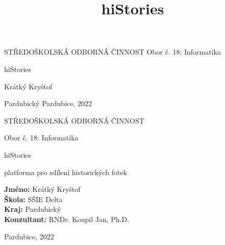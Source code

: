 \documentclass[12pt, a4paper,
 twoside,        %
 openright
]{report}
\title{hiStories} %
\author{\name} %
\date{\publicationYear} %
\newcommand\city{Pardubice}
\newcommand\district{Pardubický}
\newcommand\specialization{Obor č. 18: Informatika}
\newcommand\school{SŠIE Delta}
\newcommand\consultant{RNDr. Koupil Jan, Ph.D.}
\newcommand\name{Krátký Kryštof}
\newcommand\publicationYear{2022}
\begin{document}
\pagestyle{empty}

\begin{titlepage}
    \bfseries{ %
        \begin{center}
            \LARGE{STŘEDOŠKOLSKÁ ODBORNÁ ČINNOST} 
            \vspace{14pt}
            \large{\specialization} 

            \vspace{0.4 \textheight}

            \LARGE{ %
                hiStories
            }%

            \vspace{0.4\textheight}
        \end{center}
        
        \noindent\Large{\name}

        \noindent\Large{\district{}  \city, \publicationYear} %
        
            
    } %
\end{titlepage}

\cleardoublepage%
{\bfseries %
    \begin{center}
        \LARGE{STŘEDOŠKOLSKÁ ODBORNÁ ČINNOST}

        \vspace{14pt}
        {\large \specialization}

        \vspace{0.3 \textheight}

        \LARGE{ %
        hiStories
        }

        \LARGE{ %
        platforma pro sdílení historických fotek
        }%

        \vspace{0.24\textheight}
    \end{center}  
}%
{\Large %
    \noindent\textbf{Jméno:} \name\\
    \textbf{Škola:} \school\\
    \textbf{Kraj:} \district\\
    \textbf{Konzultant:} \consultant\\
} %

\noindent \city, \publicationYear\cleardoublepage{}  %
\end{document}
